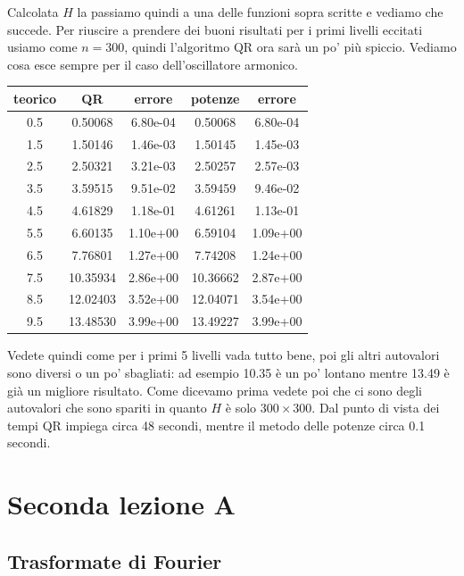\documentclass[10pt,a4paper]{article}
\begin{document}
Calcolata $H$ la passiamo quindi a una delle funzioni sopra scritte e vediamo che succede. Per riuscire a prendere dei buoni risultati per i primi livelli eccitati usiamo come $n=300$, quindi l'algoritmo QR ora sarà un po' più spiccio. Vediamo cosa esce sempre per il caso dell'oscillatore armonico.
\begin{center}
\begin{tabular}{c|cc|cc}
  \hline
  teorico & QR & errore & potenze & errore \\
  \hline 
0.5 & 0.50068 & 6.80e-04 & 0.50068 & 6.80e-04\\
1.5 & 1.50146 & 1.46e-03 & 1.50145 & 1.45e-03\\
2.5 & 2.50321 & 3.21e-03 & 2.50257 & 2.57e-03\\
3.5 & 3.59515 & 9.51e-02 & 3.59459 & 9.46e-02\\
4.5 & 4.61829 & 1.18e-01 & 4.61261 & 1.13e-01\\
5.5 & 6.60135 & 1.10e+00 & 6.59104 & 1.09e+00\\
6.5 & 7.76801 & 1.27e+00 & 7.74208 & 1.24e+00\\
7.5 & 10.35934 & 2.86e+00 & 10.36662 & 2.87e+00\\
8.5 & 12.02403 & 3.52e+00 & 12.04071 & 3.54e+00\\
9.5 & 13.48530 & 3.99e+00 & 13.49227 & 3.99e+00\\
  \hline 
\end{tabular}   
\end{center}
Vedete quindi come per i primi 5 livelli vada tutto bene, poi gli altri autovalori sono diversi o un po' sbagliati: ad esempio 10.35 è un po' lontano mentre 13.49 è già un migliore risultato. Come dicevamo prima vedete poi che ci sono degli autovalori che sono spariti in quanto $H$ è solo $300 \times 300$. Dal punto di vista dei tempi QR impiega circa 48 secondi, mentre il metodo delle potenze circa 0.1 secondi. 


















\newpage


\section{Seconda lezione A}
\subsection{Trasformate di Fourier}
\end{document}
